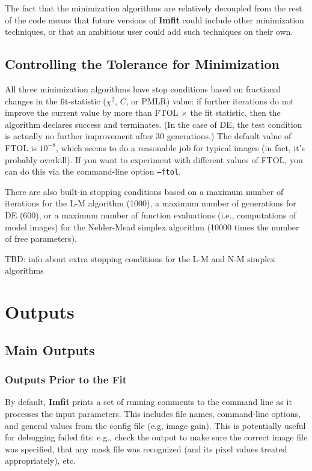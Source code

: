 \documentclass[10pt,a4paper,article]{memoir}
\newcommand{\imfit}{\textbf{Imfit}}
\newcommand{\chisquare}{\ensuremath{\chi^{2}}}
\newcommand{\pmlr}{PMLR}
\begin{document}
\medskip

The fact that the minimization algorithms are relatively decoupled from the rest
of the code means that future versions of \imfit{} could include
other minimization techniques, or that an ambitious user could add such techniques
on their own.


\section{Controlling the Tolerance for Minimization}

All three minimization algorithms have stop conditions based on
fractional changes in the fit-statistic (\chisquare{}, $C$, or \pmlr)
value: if further iterations do not improve the current value by more
than FTOL $\times$ the fit statistic, then the algorithm declares success and
terminates. (In the case of DE, the test condition is actually no
further improvement after 30 generations.) The default value of FTOL is
$10^{-8}$, which seems to do a reasonable job for typical images (in
fact, it's probably overkill). If you want to experiment with different
values of FTOL, you can do this via the command-line option
\texttt{--ftol}.

There are also built-in stopping conditions based on a maximum number of
iterations for the L-M algorithm (1000), a maximum number of generations for DE
(600), or a maximum number of function evaluations (i.e., computations of model
images) for the Nelder-Mead simplex algorithm (10000 times the number of free
parameters).

TBD: info about extra stopping conditions for the L-M and N-M simplex algorithms




\chapter{Outputs}

\section{Main Outputs}

\subsection{Outputs Prior to the Fit}

By default, \imfit{} prints a set of running comments to the command
line as it processes the input parameters. This includes file names,
command-line options, and general values from the config file (e.g,
image gain). This is potentially useful for debugging failed fits: e.g.,
check the output to make sure the correct image file was specified, that
any mask file was recognized (and its pixel values treated
appropriately), etc.
\end{document}
